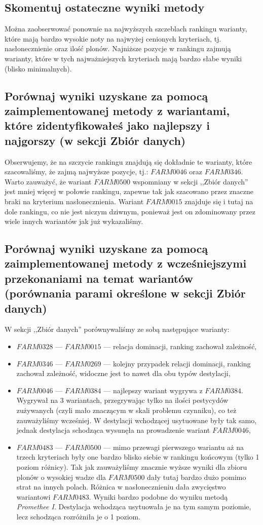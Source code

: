 \documentclass[11pt]{article}
\begin{document}
\subsection{Skomentuj ostateczne wyniki metody}
Można zaobserwować ponownie na najwyższych szczeblach rankingu warianty, które mają bardzo wysokie noty na najwyżej cenionych kryteriach, tj. nasłonecznienie oraz ilość plonów. Najniższe pozycje w rankingu zajmują warianty, które w tych najważniejszych kryteriach mają bardzo słabe wyniki (blisko minimalnych).

\subsection{Porównaj wyniki uzyskane za pomocą zaimplementowanej metody z wariantami, które zidentyfikowałeś jako najlepszy i najgorszy (w sekcji Zbiór danych)}
Obserwujemy, że na szczycie rankingu znajdują się dokładnie te warianty, które szacowaliśmy, że zajmą najwyższe pozycje, tj.: $FARM0046$ oraz $FARM0346$. Warto zauważyć, że wariant $FARM0500$ wspomniany w sekcji ,,Zbiór danych'' jest mniej więcej w połowie rankingu, zapewne tak jak szacowano przez znaczne braki na kryterium nasłonecznienia. Wariant $FARM0015$ znajduje się i tutaj na dole rankingu, co nie jest niczym dziwnym, ponieważ jest on zdominowany przez wiele innych wariantów jak już wykazaliśmy.

\subsection{Porównaj wyniki uzyskane za pomocą zaimplementowanej metody z wcześniejszymi przekonaniami na temat wariantów (porównania parami określone w sekcji Zbiór danych)}
W sekcji ,,Zbiór danych'' porównywaliśmy ze sobą następujące warianty:
\begin{itemize}
\item $FARM0328$ --- $FARM0015$ --- relacja dominacji, ranking zachował zależność,
\item $FARM0346$ --- $FARM0269$ --- kolejny przypadek relacji dominacji, ranking zachował zależność, widoczne jest to nawet dla obu typów destylacji,
\item $FARM0046$ --- $FARM0384$ --- najlepszy wariant wygrywa z $FARM0384$. Wygrywał na 3 wariantach, przegrywając tylko na ilości pestycydów zużywanych (czyli mało znaczącym w skali problemu czynniku), co też zauważyliśmy wcześniej. W destylacji wchodzącej usytuowane były tak samo, jednak destylacja schodząca wysunęła na prowadzenie wariant $FARM0046$,
\item $FARM0483$ --- $FARM0500$ --- mimo przewagi pierwszego wariantu aż na trzech kryteriach były one bardzo blisko siebie w rankingu końcowym (tylko 1 poziom różnicy). Tak jak zauważyliśmy znacznie wyższe wyniki dla zbioru plonów o wysokiej wadze dla $FARM0500$ dały tutaj bardzo dużo pomimo strat na innych polach. Różnica w nasłonecznieniu dała zwycięstwo wariantowi $FARM0483$. Wyniki bardzo podobne do wyniku metodą \textit{Promethee I}. Destylacja wchodząca usytuowała je na tym samym poziomie, lecz schodząca rozróżniła je o 1 poziom.
\end{itemize}
\end{document}

